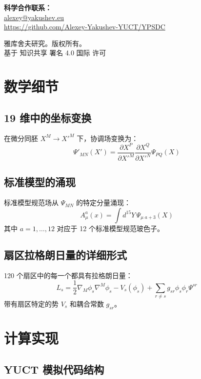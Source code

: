 \documentclass[11pt,a4paper]{article}
\theoremstyle{remark}
\begin{document}
	\begin{center}
		\vspace{1cm}
		\textbf{科学合作联系：}\\
		\url{alexey@yakushev.eu}\\
		\url{https://github.com/Alexey-Yakushev-YUCT/YPSDC}
		
		\vspace{0.5cm}
		 雅库舍夫研究。版权所有。\\
		基于 知识共享 署名 4.0 国际 许可
	\end{center}
	
	\appendix
	\section{数学细节}
	\label{app:math-details}
	
	\subsection{19 维中的坐标变换}
	
	在微分同胚 $X^M \to X'^M$ 下，协调场变换为：
	\[
	\Psi'_{MN}(X') = \frac{\partial X^P}{\partial X'^M} \frac{\partial X^Q}{\partial X'^N} \Psi_{PQ}(X)
	\]
	
	\subsection{标准模型的涌现}
	
	标准模型规范场从 $\Psi_{MN}$ 的特定分量涌现：
	\[
	A_\mu^a(x) = \int d^{15}Y \, \Psi_{\mu\;a+3}(X)
	\]
	其中 $a=1,\dots,12$ 对应于 12 个标准模型规范玻色子。
	
	\subsection{扇区拉格朗日量的详细形式}
	
	120 个扇区中的每一个都具有拉格朗日量：
	\[
	L_s = \frac{1}{2} \nabla_M \phi_s \nabla^M \phi_s - V_s(\phi_s) + \sum_{r \neq s} g_{sr} \phi_s \phi_r \Psi^{sr}
	\]
	带有扇区特定的势 $V_s$ 和耦合常数 $g_{sr}$。
	
	\section{计算实现}
	\label{app:computational}
	
	\subsection{YUCT 模拟代码结构}
	
\end{document}
